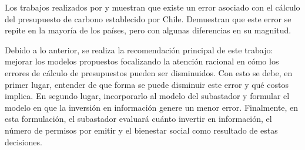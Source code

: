 Los trabajos realizados por  y  muestran que existe un error asociado con el cálculo del presupuesto de carbono establecido por Chile. Demuestran que este error se repite en la mayoría de los países, pero con algunas diferencias en su magnitud.
\vspace{2.5mm}

Debido a lo anterior, se realiza la recomendación principal de este trabajo: mejorar los modelos propuestos focalizando la atención racional en cómo los errores de cálculo de presupuestos pueden ser disminuidos. Con esto se debe, en primer lugar, entender de que forma se puede disminuir este error y qué costos implica. En segundo lugar, incorporarlo al modelo del subastador y formular el modelo en que la inversión en información genere un menor error. Finalmente, en esta formulación,  el subastador evaluará cuánto invertir en información, el número de permisos por emitir y el bienestar social como resultado de estas decisiones.





